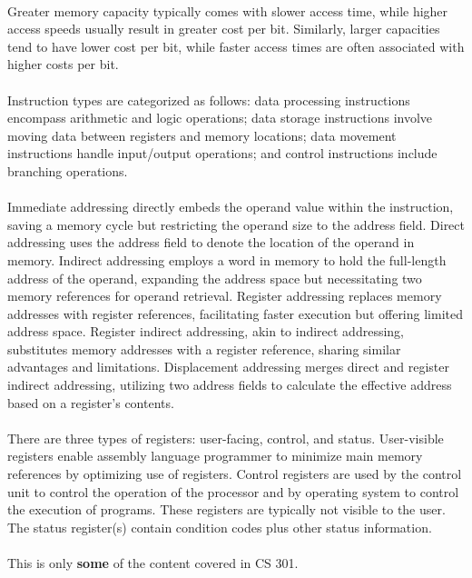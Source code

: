 \documentclass{article}
\begin{document}
\begin{enumerate}
		  \paragraph{} Greater memory capacity typically comes with slower access time, while higher access speeds usually result in 
		  greater cost per bit. Similarly, larger capacities tend to have lower cost per bit, while faster access times are often 
		  associated with higher costs per bit.
		  
		  \paragraph{} Instruction types are categorized as follows: data processing instructions encompass arithmetic and logic 
		  operations; data storage instructions involve moving data between registers and memory locations; data movement 
		  instructions handle input/output operations; and control instructions include branching operations.

		  \paragraph{} Immediate addressing directly embeds the operand value within the instruction, saving a memory cycle but 
		  restricting the operand size to the address field. Direct addressing uses the address field to denote the location of 
		  the operand in memory. Indirect addressing employs a word in memory to hold the full-length address of the operand, 
		  expanding the address space but necessitating two memory references for operand retrieval. Register addressing replaces 
		  memory addresses with register references, facilitating faster execution but offering limited address space. Register 
		  indirect addressing, akin to indirect addressing, substitutes memory addresses with a register reference, sharing similar 
		  advantages and limitations. Displacement addressing merges direct and register indirect addressing, utilizing two address 
		  fields to calculate the effective address based on a register's contents.
		  
		  \paragraph{} There are three types of registers: user-facing, control, and status. User-visible registers enable assembly 
		  language programmer to minimize main memory references by optimizing use of registers. Control registers are used by the
		  control unit to control the operation of the processor and by operating system to control the execution of programs.
		  These registers are typically not visible to the user. The status register(s) contain condition codes plus other status
		  information.

		  \paragraph{} This is only \textbf{some} of the content covered in CS 301.

\end{enumerate}
\end{document}
